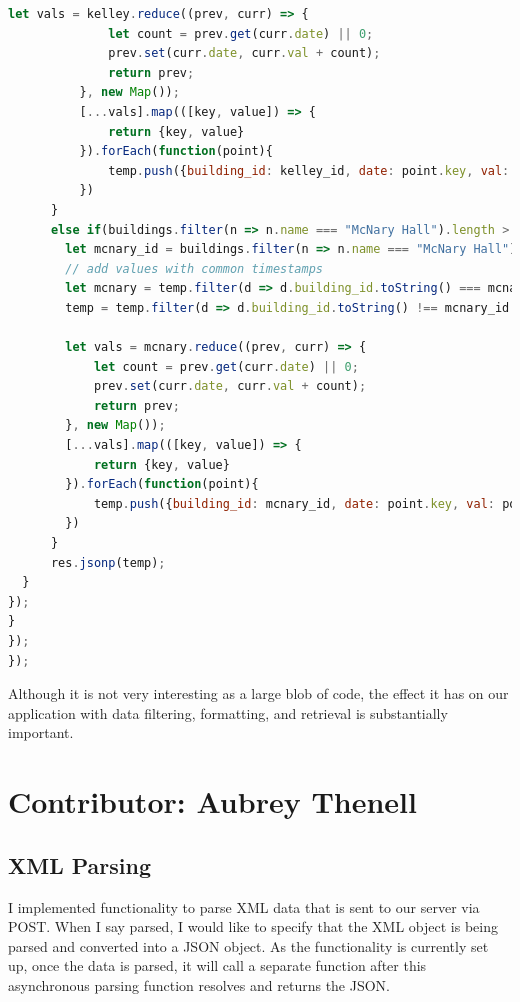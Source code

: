 \documentclass[letterpaper,10pt,serif,draftclsnofoot,onecolumn,compsoc,titlepage]{IEEEtran}
\begin{document}
\begin{lstlisting}[language=JavaScript]
          let vals = kelley.reduce((prev, curr) => {
              let count = prev.get(curr.date) || 0;
              prev.set(curr.date, curr.val + count);
              return prev;
          }, new Map());
          [...vals].map(([key, value]) => {
              return {key, value}
          }).forEach(function(point){
              temp.push({building_id: kelley_id, date: point.key, val: point.value})
          })
      }
      else if(buildings.filter(n => n.name === "McNary Hall").length > 0){
        let mcnary_id = buildings.filter(n => n.name === "McNary Hall")[0].building_id;
        // add values with common timestamps
        let mcnary = temp.filter(d => d.building_id.toString() === mcnary_id.toString());
        temp = temp.filter(d => d.building_id.toString() !== mcnary_id.toString());

        let vals = mcnary.reduce((prev, curr) => {
            let count = prev.get(curr.date) || 0;
            prev.set(curr.date, curr.val + count);
            return prev;
        }, new Map());
        [...vals].map(([key, value]) => {
            return {key, value}
        }).forEach(function(point){
            temp.push({building_id: mcnary_id, date: point.key, val: point.value})
        })
      }
      res.jsonp(temp);
  }
});
}
});
});
\end{lstlisting}

Although it is not very interesting as a large blob of code, the effect it has on our application with data filtering, formatting, and retrieval is substantially important.

\section{Contributor: Aubrey Thenell}
\subsection{XML Parsing}
I implemented functionality to parse XML data that is sent to our server via POST. When I say parsed, I would like to specify that the XML object is being parsed and converted into a JSON object. As the functionality is currently set up, once the data is parsed, it will call a separate function after this asynchronous parsing function resolves and returns the JSON. 
\end{document}
